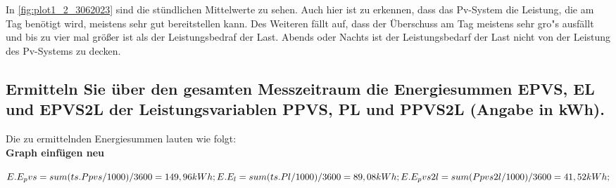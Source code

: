 In \autoref{fig:plot1_2_3062023} sind die stündlichen Mittelwerte zu sehen. Auch hier ist zu erkennen, dass das Pv-System die Leistung, die am Tag benötigt wird, meistens sehr gut bereitstellen kann. Des Weiteren fällt auf, dass der Überschuss am Tag meistens sehr gro"s ausfällt und bis zu vier mal größer ist als der Leistungsbedraf der Last. Abends oder Nachts ist der Leistungsbedarf der Last nicht von der Leistung des Pv-Systems zu decken.
\subsection{Ermitteln Sie über den gesamten Messzeitraum die Energiesummen EPVS, EL und EPVS2L der
Leistungsvariablen PPVS, PL und PPVS2L (Angabe in kWh).}
Die zu ermittelnden Energiesummen lauten wie folgt:
\\
\textbf{Graph einfügen neu}

$E.E_pvs = sum(ts.Ppvs/1000)/3600=149,96kWh;\\
E.E_l = sum(ts.Pl/1000)/3600=89,08kWh;\\
E.E_pvs2l = sum(Ppvs2l/1000)/3600=41,52kWh;$\\

